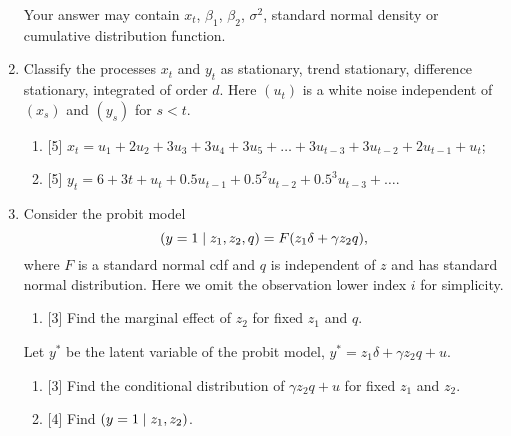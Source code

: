 \documentclass[12pt]{article}
\let\P\relax
\DeclareMathOperator{\P}{\mathbb{P}}
\begin{document}
\begin{enumerate}


    Your answer may contain  $x_t$, $\beta_1$, $\beta_2$, $\sigma^2$, standard normal density or cumulative distribution function.
    

    \item Classify the processes $x_t$ and $y_t$ as stationary, trend stationary, difference stationary, integrated of order $d$.
    Here $(u_t)$ is a white noise independent of $(x_s)$ and $(y_s)$ for $s < t$.
    \begin{enumerate}
        \item {[5]} $x_t = u_1 + 2u_2 + 3u_3 + 3u_4 + 3u_5 + \dots + 3u_{t-3} + 3u_{t-2} + 2u_{t-1} + u_t$; 
        \item {[5]} $y_t = 6 + 3t + u_t + 0.5 u_{t-1} + 0.5^2 u_{t-2} + 0.5^3 u_{t-3} + \dots$.
    \end{enumerate}

\newpage
    \item 
Consider the probit model
\[
\P(y = 1 \mid z_1, z_2, q) = F(z_1 \delta + \gamma z_2 q),
\]
where $F$ is a standard normal cdf and $q$ is independent of $z$ and has standard normal distribution. 
Here we omit the observation lower index $i$ for simplicity. 
\begin{enumerate}
\item {[3]} Find the marginal effect of $z_2$ for fixed $z_1$ and $q$.
\end{enumerate}
Let $y^*$ be the latent variable of the probit model, $y^* = z_1 \delta + \gamma z_2 q + u$.
\begin{enumerate}[resume]
    \item {[3]} Find the conditional distribution of $\gamma z_2 q + u$ for fixed $z_1$ and $z_2$.
    \item {[4]} Find $\P(y = 1 \mid z_1, z_2)$. 
\end{enumerate}


\end{enumerate}
\end{document}
